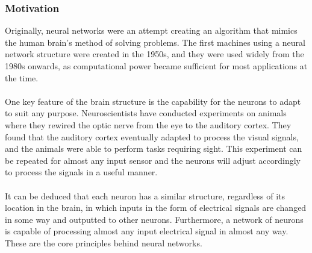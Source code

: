 \documentclass[a4paper,12pt]{article}
\numberwithin{equation}{section}
\begin{document}
\subsubsection{Motivation}
Originally, neural networks were an attempt creating an algorithm that mimics the human brain's method of solving problems. The first machines using a neural network structure were created in the 1950s, and they were used widely from the 1980s onwards, as computational power became sufficient for most applications at the time.\\
\\
One key feature of the brain structure is the capability for the neurons to adapt to suit any purpose. Neuroscientists have conducted experiments on animals where they rewired the optic nerve from the eye to the auditory cortex. They found that the auditory cortex eventually adapted to process the visual signals, and the animals were able to perform tasks requiring sight. This experiment can be repeated for almost any input sensor and the neurons will adjust accordingly to process the signals in a useful manner.\\
\\
It can be deduced that each neuron has a similar structure, regardless of its location in the brain, in which inputs in the form of electrical signals are changed in some way and outputted to other neurons. Furthermore, a network of neurons is capable of processing almost any input electrical signal in almost any way. These are the core principles behind neural networks.
\end{document}
